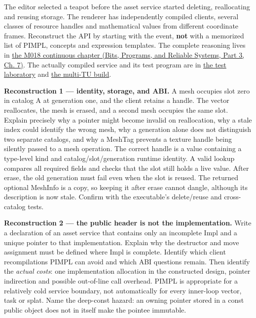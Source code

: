 The editor selected a teapot before the asset service started deleting, reallocating and reusing storage. The renderer has independently compiled clients, several classes of resource handles and mathematical values from different coordinate frames. Reconstruct the API by starting with the event, \textbf{not} with a memorized list of PIMPL, concepts and expression templates. The complete reasoning lives in \href{../01-Bits-Programs-and-Reliable-Systems-P03/main.pdf\#nameddest=01-foundations-i-ch007-a-registry-crosses-its-last-c-boundary-hidden-implementation-typed-identity-and-measured-abstraction-cost}{the M018 continuous chapter (Bits, Programs, and Reliable Systems, Part 3, Ch. 7)}. The actually compiled service and its test program are in \hyperref[source-file-8aedc3fdcd10c91971507448]{the test laboratory} and \hyperref[source-file-c936569afa19be638ec87991]{the multi-TU build}.

\textbf{Reconstruction 1 --- identity, storage, and ABI.} A mesh occupies slot zero in catalog A at generation one, and the client retains a handle. The vector reallocates, the mesh is erased, and a second mesh occupies the same slot. Explain precisely why a pointer might become invalid on reallocation, why a stale index could identify the wrong mesh, why a generation alone does not distinguish two separate catalogs, and why a MeshTag prevents a texture handle being silently passed to a mesh operation. The correct handle is a value containing a type-level kind and catalog/slot/generation runtime identity. A valid lookup compares all required fields and checks that the slot still holds a live value. After erase, the old generation must fail even when the slot is reused. The returned optional MeshInfo is a copy, so keeping it after erase cannot dangle, although its description is now stale. Confirm with the executable's delete/reuse and cross-catalog tests.

\textbf{Reconstruction 2 --- the public header is not the implementation.} Write a declaration of an asset service that contains only an incomplete Impl and a unique pointer to that implementation. Explain why the destructor and move assignment must be defined where Impl is complete. Identify which client recompilations PIMPL can avoid and which ABI questions remain. Then identify the \emph{actual costs}: one implementation allocation in the constructed design, pointer indirection and possible out-of-line call overhead. PIMPL is appropriate for a relatively cold service boundary, not automatically for every inner-loop vector, task or splat. Name the deep-const hazard: an owning pointer stored in a const public object does not in itself make the pointee immutable.

